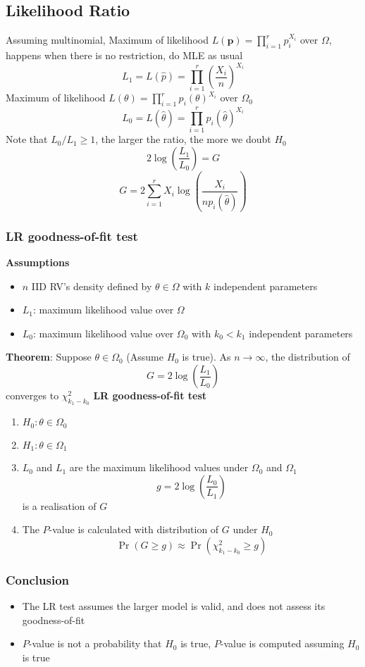 \documentclass{article}
\begin{document}
\begin{multicols}{2}
\subsection{Likelihood Ratio}
Assuming multinomial, Maximum of likelihood $L(\textbf{p}) = \prod_{i=1}^{r}p_i^{X_i}$ over $\Omega$, happens when there is no restriction, do MLE as usual
$$L_1 = L(\hat{p}) = \prod_{i=1}^{r}\left(\frac{X_i}{n}\right)^{X_i}$$
Maximum of likelihood $L(\theta) = \prod_{i=1}^{r}p_i(\theta)^{X_i}$ over $\Omega_0$
$$L_0 = L(\hat{\theta}) = \prod_{i=1}^{r} p_i(\hat{\theta})^{X_i}$$
Note that $L_0/L_1 \geq1$, the larger the ratio, the more we doubt $H_0$
$$2\log\left(\frac{L_1}{L_0}\right)=G$$
$$G=2\sum_{i=1}^rX_i\log{ \left(\frac{X_i}{np_i(\hat{\theta})}\right) }$$
\subsubsection{LR goodness-of-fit test}
\textbf{Assumptions}
\begin{itemize}
	\item $n$ IID RV's density defined by $\theta \in \Omega$ with $k$ independent parameters
	\item $L_1$: maximum likelihood value over $\Omega$
	\item $L_0$: maximum likelihood value over $\Omega_0$ with $k_0<k_1$ independent parameters
\end{itemize}
\textbf{Theorem}: Suppose $\theta\in\Omega_0$ (Assume $H_0$ is true). As $n\rightarrow\infty$, the distribution of
$$G = 2\log\left(\frac{L_1}{L_0}\right)$$ converges to $\chi^2_{k_1-k_0}$
\textbf{LR goodness-of-fit test}
\begin{enumerate}
	\item $H_0:\theta\in\Omega_0$
	\item $H_1:\theta\in\Omega_1$
	\item $L_0$ and $L_1$ are the maximum likelihood values under $\Omega_0$ and $\Omega_1$
	$$g=2\log\left(\frac{L_0}{L_1}\right)$$
	is a realisation of $G$
	\item The $P$-value is calculated with distribution of $G$ under $H_0$
	$$\Pr(G\geq g) \approx \Pr(\chi^2_{k_1-k_0}\geq g)$$
\end{enumerate}

\subsubsection{Conclusion}
\begin{itemize}
	\item The LR test assumes the larger model is valid, and does not assess its goodness-of-fit
	\item $P$-value is not a probability that $H_0$ is true, $P$-value is computed assuming $H_0$ is true
\end{itemize}


\end{multicols}
\end{document}
